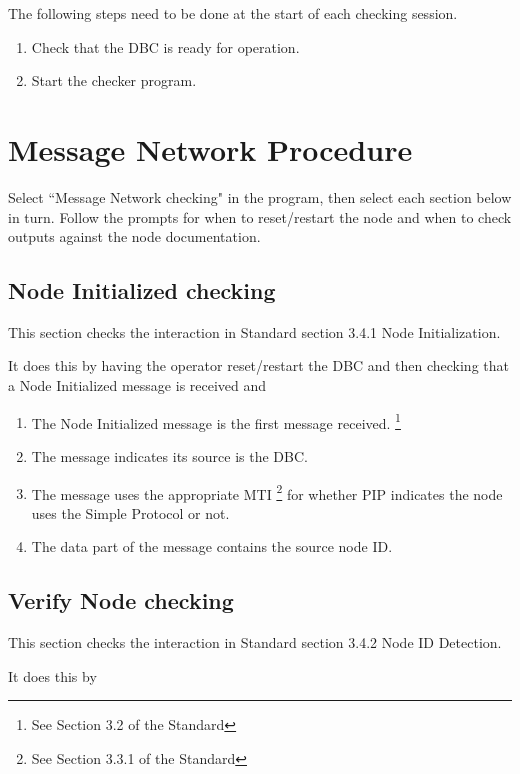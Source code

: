\documentclass[11pt]{article}
\begin{document}
The following steps need to be done at the start of each checking session.
\begin{enumerate}
\item Check that the DBC is ready for operation.
\item Start the checker program.
\end{enumerate}

\section{Message Network Procedure}

Select ``Message Network checking" in the program, 
then select each section below in turn.  Follow the prompts
for when to reset/restart the node and when to check 
outputs against the node documentation.

\subsection{Node Initialized checking}

This section checks the interaction in Standard section 3.4.1 Node Initialization.

It does this by having the operator reset/restart the DBC and then
checking that a Node Initialized message is received and
    \begin{enumerate}
    \item The Node Initialized message is the first message received.
            \footnote{See Section 3.2 of the Standard}
    \item The message indicates its source is the DBC.
    \item The message uses the appropriate MTI
            \footnote{See Section 3.3.1 of the Standard}
            for whether PIP indicates the node 
            uses the Simple Protocol or not.
    \item The data part of the message contains the source node ID.
    \end{enumerate}


\subsection{Verify Node checking}

This section checks the interaction in Standard section 3.4.2 Node ID Detection.

It does this by
\end{document}
